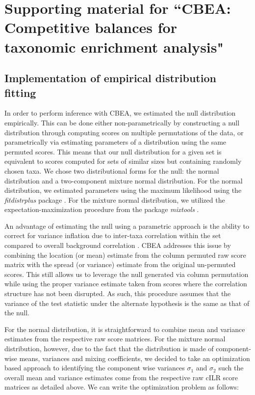 \chapter{Supporting material for ``CBEA: Competitive balances for taxonomic enrichment analysis"}
\section{Implementation of empirical distribution fitting}

In order to perform inference with CBEA, we estimated the null distribution empirically. This can be done either non-parametrically by constructing a null distribution through computing scores on multiple permutations of the data, or parametrically via estimating parameters of a distribution using the same permuted scores. This means that our null distribution for a given set is equivalent to scores computed for sets of similar sizes but containing randomly chosen taxa. We chose two distributional forms for the null: the normal distribution and a two-component mixture normal distribution. For the normal distribution, we estimated parameters using the maximum likelihood using the \emph{fitdistrplus} package \cite{delignette-muller2015fitdistrplus}. For the mixture normal distribution, we utilized the expectation-maximization procedure from the package \emph{mixtools} \cite{benaglia2009mixtools}. 

An advantage of estimating the null using a parametric approach is the ability to correct for variance inflation due to inter-taxa correlation within the set compared to overall background correlation \cite{wu2012camera}. CBEA addresses this issue by combining the location (or mean) estimate from the column permuted raw score matrix with the spread (or variance) estimate from the original un-permuted scores. This still allows us to leverage the null generated via column permutation while using the proper variance estimate taken from scores where the correlation structure has not been disrupted. As such, this procedure assumes that the variance of the test statistic under the alternate hypothesis is the same as that of the null.  

For the normal distribution, it is straightforward to combine mean and variance estimates from the respective raw score matrices. For the mixture normal distribution, however, due to the fact that the distribution is made of component-wise means, variances and mixing coefficients, we decided to take an optimization based approach to identifying the component wise variances $\sigma_1$ and $\sigma_2$ such the overall mean and variance estimates come from the respective raw cILR score matrices as detailed above. We can write the optimization problem as follows: 

